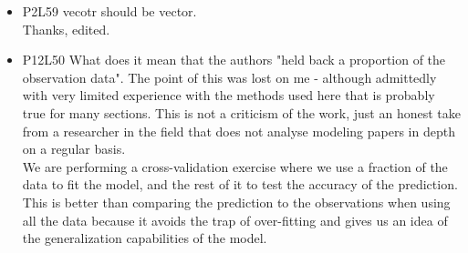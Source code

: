 \documentclass[12pt]{paper}
\begin{document}
{\begin{itemize}
{\color{red} We have amended the sentence in the introduction to read ''These sterile male mosquitoes are reproductively contained (but females that carry the sterilising construct are fertile) and could represent the first stage in a three-stage pathway to malaria vector control using a gene drive that results in a male-biased sex ratio''. We have also added additional text in the discussion (in conjunction with a response to reviewer 1) highlighting that the risk assessment, within which this analysis was conducted, also addressed the risks associated with the accidental release of fertile females.}
\item P2L59 vecotr should be vector.\\
{\color{red} Thanks, edited.}
\item P12L50 What does it mean that the authors "held back a proportion of the observation data". The point of this was lost on me - although admittedly with very limited experience with the methods used here that is probably true for many sections. This is not a criticism of the work, just an honest take from a researcher in the field that does not analyse modeling papers in depth on a regular basis.\\
{\color{red} We are performing a cross-validation exercise where we use a fraction of the data to fit the model, and the rest of it to test the accuracy of the prediction. This is better than comparing the prediction to the observations when using all the data because it avoids the trap of over-fitting and gives us an idea of the generalization capabilities of the model.}
\end{itemize} 
}
~\\
~\\
\end{document}
